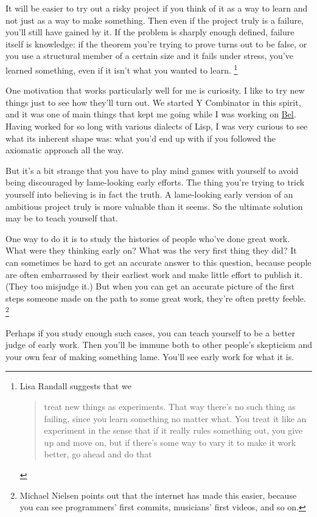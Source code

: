 \documentclass[12pt]{book}
\begin{document}
It will be easier to try out a risky project if you think of it as a way
to learn and not just as a way to make something. Then even if the
project truly is a failure, you'll still have gained by it. If the
problem is sharply enough defined, failure itself is knowledge: if the
theorem you're trying to prove turns out to be false, or you use a
structural member of a certain size and it fails under stress, you've
learned something, even if it isn't what you wanted to learn.
\footnote{Lisa Randall suggests that we

\begin{quote}
treat new things as experiments. That way there's no such thing as
failing, since you learn something no matter what. You treat it like an
experiment in the sense that if it really rules something out, you give
up and move on, but if there's some way to vary it to make it work
better, go ahead and do that
\end{quote}}

One motivation that works particularly well for me is curiosity. I like
to try new things just to see how they'll turn out. We started Y
Combinator in this spirit, and it was one of main things that kept me
going while I was working on \href{bel.html}{Bel}. Having worked for so
long with various dialects of Lisp, I was very curious to see what its
inherent shape was: what you'd end up with if you followed the axiomatic
approach all the way.

But it's a bit strange that you have to play mind games with yourself to
avoid being discouraged by lame-looking early efforts. The thing you're
trying to trick yourself into believing is in fact the truth. A
lame-looking early version of an ambitious project truly is more
valuable than it seems. So the ultimate solution may be to teach
yourself that.

One way to do it is to study the histories of people who've done great
work. What were they thinking early on? What was the very first thing
they did? It can sometimes be hard to get an accurate answer to this
question, because people are often embarrassed by their earliest work
and make little effort to publish it. (They too misjudge it.) But when
you can get an accurate picture of the first steps someone made on the
path to some great work, they're often pretty feeble.
\footnote{Michael Nielsen points out that the internet has made this
easier, because you can see programmers' first commits, musicians' first
videos, and so on.}

Perhaps if you study enough such cases, you can teach yourself to be a
better judge of early work. Then you'll be immune both to other people's
skepticism and your own fear of making something lame. You'll see early
work for what it is.
\end{document}
